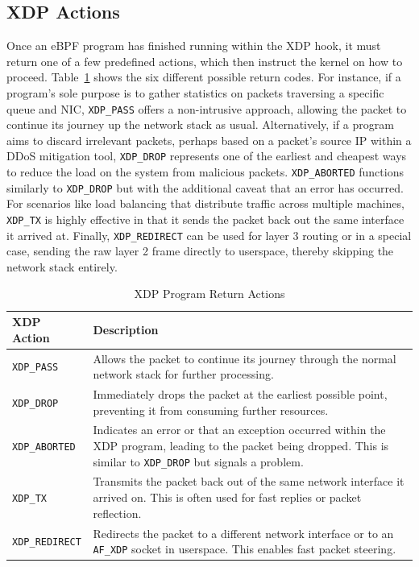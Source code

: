 \subsection{XDP Actions}
\label{subsec:xdp-actions}
Once an \ac{eBPF} program has finished running within the XDP hook, it must return one of a few predefined actions, which then instruct the kernel on how to proceed. Table~\ref{tab:xdp_actions} shows the six different possible return codes. For instance, if a program's sole purpose is to gather statistics on packets traversing a specific queue and \ac{NIC}, \texttt{XDP\_PASS} offers a non-intrusive approach, allowing the packet to continue its journey up the network stack as usual. Alternatively, if a program aims to discard irrelevant packets, perhaps based on a packet's source IP within a \ac{DDoS} mitigation tool, \texttt{XDP\_DROP} represents one of the earliest and cheapest ways to reduce the load on the system from malicious packets. \texttt{XDP\_ABORTED} functions similarly to \texttt{XDP\_DROP} but with the additional caveat that an error has occurred. For scenarios like load balancing that distribute traffic across multiple machines, \texttt{XDP\_TX} is highly effective in that it sends the packet back out the same interface it arrived at. Finally, \texttt{XDP\_REDIRECT} can be used for layer 3 routing or in a special case, sending the raw layer 2 frame directly to userspace, thereby skipping the network stack entirely.

\begin{table}[h]
    \centering
    \begin{tabular}{l p{10cm}}
        \toprule
        XDP Action & Description \\
        \midrule
        \texttt{XDP\_PASS} & Allows the packet to continue its journey through the normal network stack for further processing. \\
        \texttt{XDP\_DROP} & Immediately drops the packet at the earliest possible point, preventing it from consuming further resources. \\
        \texttt{XDP\_ABORTED} & Indicates an error or that an exception occurred within the XDP program, leading to the packet being dropped. This is similar to \texttt{XDP\_DROP} but signals a problem. \\
        \texttt{XDP\_TX} & Transmits the packet back out of the same network interface it arrived on. This is often used for fast replies or packet reflection. \\
        \texttt{XDP\_REDIRECT} & Redirects the packet to a different network interface or to an \texttt{AF\_XDP} socket in userspace. This enables fast packet steering. \\
        \bottomrule
    \end{tabular}
    \caption{XDP Program Return Actions}
    \label{tab:xdp_actions}
\end{table}


